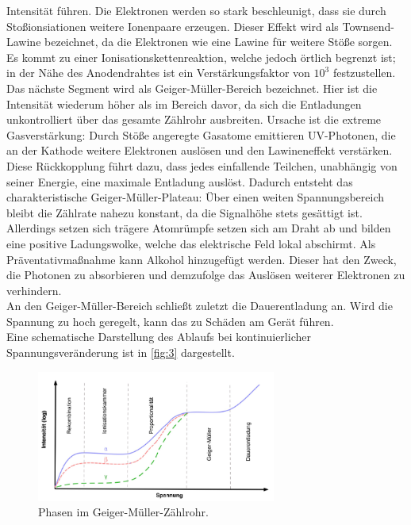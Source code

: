 Intensität führen. Die Elektronen werden so stark beschleunigt, dass sie durch 
Stoßionsiationen weitere Ionenpaare erzeugen. Dieser Effekt wird als Townsend-
Lawine bezeichnet, da die Elektronen wie eine Lawine für weitere Stöße sorgen.
Es kommt zu einer Ionisationskettenreaktion, welche jedoch örtlich begrenzt ist;
in der Nähe des Anodendrahtes ist ein Verstärkungsfaktor von $10^3$ festzustellen.
\vspace{0.5em}
\\
\noindent Das nächste Segment wird als Geiger-Müller-Bereich bezeichnet. Hier
ist die Intensität wiederum höher als im Bereich davor, da sich die Entladungen
unkontrolliert über das gesamte Zählrohr ausbreiten. Ursache ist die extreme
Gasverstärkung: Durch Stöße angeregte Gasatome emittieren UV-Photonen, die an
der Kathode weitere Elektronen auslösen und den Lawineneffekt verstärken.
Diese Rückkopplung führt dazu, dass jedes einfallende Teilchen, unabhängig
von seiner Energie, eine maximale Entladung auslöst. Dadurch entsteht das
charakteristische Geiger-Müller-Plateau: Über einen weiten Spannungsbereich 
bleibt die Zählrate nahezu konstant, da die Signalhöhe stets gesättigt ist.
Allerdings setzen sich trägere Atomrümpfe setzen sich am Draht ab und bilden
eine positive Ladungswolke, welche das elektrische Feld lokal abschirmt. Als
Präventativmaßnahme kann Alkohol hinzugefügt werden. Dieser hat den Zweck, die
Photonen zu absorbieren und demzufolge das Auslösen weiterer Elektronen zu
verhindern.
\vspace{0.5em}
\\
\noindent An den Geiger-Müller-Bereich schließt zuletzt die Dauerentladung an.
Wird die Spannung zu hoch geregelt, kann das zu Schäden am Gerät führen.
\vspace{0.5em}
\\
\noindent Eine schematische Darstellung des Ablaufs bei kontinuierlicher 
Spannungsveränderung ist in \autoref{fig:3} dargestellt.
\begin{figure}[H]
    \centering
        \centering
        \includegraphics[width=0.7\textwidth]{Bilder/phasen.png}
        \caption{Phasen im Geiger-Müller-Zählrohr. \cite{anleitung6}}
    \hfill
    \label{fig:3}
\end{figure}

